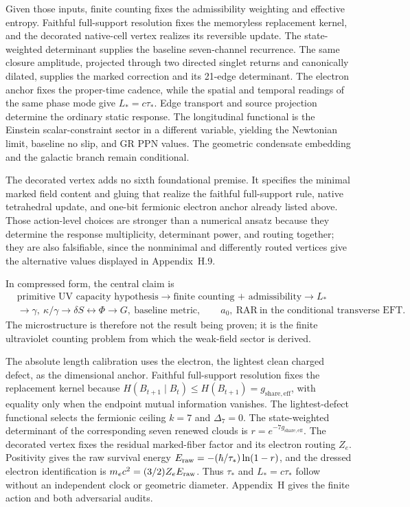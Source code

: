 \documentclass[11pt]{article}
\begin{document}
Given those inputs, finite counting fixes the admissibility weighting and effective entropy. Faithful full-support resolution fixes the memoryless replacement kernel, and the decorated native-cell vertex realizes its reversible update. The state-weighted determinant supplies the baseline seven-channel recurrence. The same closure amplitude, projected through two directed singlet returns and canonically dilated, supplies the marked correction and its 21-edge determinant. The electron anchor fixes the proper-time cadence, while the spatial and temporal readings of the same phase mode give $L_*=c\tau_*$. Edge transport and source projection determine the ordinary static response. The longitudinal functional is the Einstein scalar-constraint sector in a different variable, yielding the Newtonian limit, baseline no slip, and GR PPN values. The geometric condensate embedding and the galactic branch remain conditional.

The decorated vertex adds no sixth foundational premise. It specifies the minimal marked field content and gluing that realize the faithful full-support rule, native tetrahedral update, and one-bit fermionic electron anchor already listed above. Those action-level choices are stronger than a numerical ansatz because they determine the response multiplicity, determinant power, and routing together; they are also falsifiable, since the nonminimal and differently routed vertices give the alternative values displayed in Appendix~H.9.

In compressed form, the central claim is
\[
\begin{aligned}
&\boxed{\text{primitive UV capacity hypothesis}}
\rightarrow
\boxed{\text{finite counting + admissibility}}
\rightarrow
\boxed{L_*}
\\
&\rightarrow
\boxed{\gamma,\ \kappa/\gamma}
\rightarrow
\boxed{\delta S \leftrightarrow \Phi}
\rightarrow
\boxed{G,\ \text{baseline metric}},
\qquad
\boxed{a_0,\ \mathrm{RAR}}\ \text{in the conditional transverse EFT}.
\end{aligned}
\]
The microstructure is therefore not the result being proven; it is the finite ultraviolet counting problem from which the weak-field sector is derived.

The absolute length calibration uses the electron, the lightest clean charged defect, as the dimensional anchor. Faithful full-support resolution fixes the replacement kernel because $H(B_{t+1}\mid B_t)\le H(B_{t+1})=g_{\mathrm{share,eff}}$, with equality only when the endpoint mutual information vanishes. The lightest-defect functional selects the fermionic ceiling $k=7$ and $\Delta_7=0$. The state-weighted determinant of the corresponding seven renewed clouds is $r=e^{-7g_{\mathrm{share,eff}}}$. The decorated vertex fixes the residual marked-fiber factor and its electron routing $Z_e$. Positivity gives the raw survival energy $E_{\rm raw}=-(\hbar/\tau_*)\ln(1-r)$, and the dressed electron identification is $m_ec^2=(3/2)Z_eE_{\rm raw}$. Thus $\tau_*$ and $L_*=c\tau_*$ follow without an independent clock or geometric diameter. Appendix~H gives the finite action and both adversarial audits.
\end{document}
